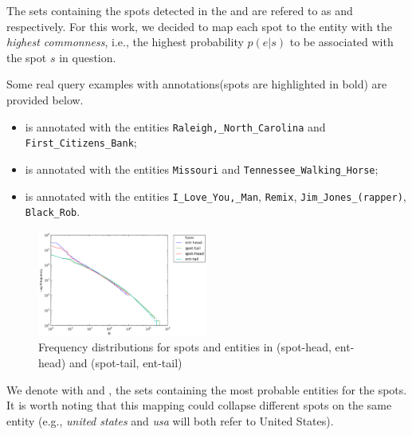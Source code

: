 The sets containing the spots detected in the 
\head{} and \tail{} are refered to as \shead{} and \stail{} respectively. 
For this work, we decided to map each spot to the entity with the \emph{highest commonness}, 
i.e., the highest probability $p(e|s)$ to be associated with the spot $s$ in question.

Some real query examples with annotations(spots are highlighted in bold) are provided below.
\begin{itemize}
\item {} is annotated with the entities 
\texttt{Raleigh,\_North\_Carolina} and \\ \texttt{First\_Citizens\_Bank};
\item {} is annotated with the entities  \texttt{Missouri} and  \texttt{Tennessee\_Walking\_Horse};
\item {} is annotated with the entities  \texttt{I\_Love\_You,\_Man}, \texttt{Remix}, \texttt{Jim\_Jones\_(rapper)}, \texttt{Black\_Rob}.
 \end{itemize}
 
 \begin{figure}
   \centering
     \includegraphics[width = 0.5\textwidth]{images/head-tail-ent-spot-dist.png}
 	\caption{Frequency distributions for spots and entities in \head{} (spot-head, ent-head) and \tail{} (spot-tail, ent-tail)}
 \label{img:distributions}
 \end{figure}


We denote with \ehead{} and \etail{}, the sets containing the most probable entities for the spots. 
It is worth noting that this mapping could collapse different spots on the same entity (e.g., \emph{united states} and 
\emph{usa} will both refer to United States). 

